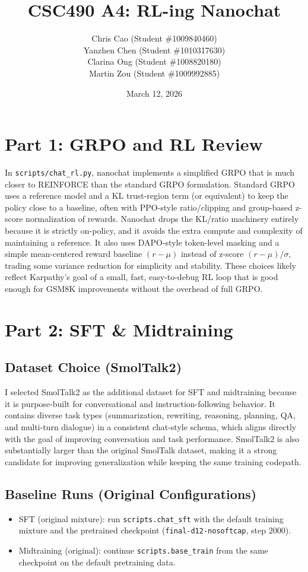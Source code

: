 \documentclass[11pt]{article}
\title{CSC490 A4: RL-ing Nanochat}
\author{
Chris Cao (Student \#1009840460)\\
Yanzhen Chen (Student \#1010317630)\\
Clarina Ong (Student \#1008820180)\\
Martin Zou (Student \#1009992885)
}
\date{March 12, 2026}
\begin{document}
\maketitle

\section*{Part 1: GRPO and RL Review}
In \texttt{scripts/chat\_rl.py}, nanochat implements a simplified GRPO that is much closer to REINFORCE than the standard GRPO formulation. Standard GRPO uses a reference model and a KL trust-region term (or equivalent) to keep the policy close to a baseline, often with PPO-style ratio/clipping and group-based z-score normalization of rewards. Nanochat drops the KL/ratio machinery entirely because it is strictly on-policy, and it avoids the extra compute and complexity of maintaining a reference. It also uses DAPO-style token-level masking and a simple mean-centered reward baseline $(r - \mu)$ instead of z-score $(r - \mu)/\sigma$, trading some variance reduction for simplicity and stability. These choices likely reflect Karpathy's goal of a small, fast, easy-to-debug RL loop that is good enough for GSM8K improvements without the overhead of full GRPO.

\section*{Part 2: SFT \& Midtraining}

\subsection*{Dataset Choice (SmolTalk2)}
I selected SmolTalk2 as the additional dataset for SFT and midtraining because it is purpose-built for conversational and instruction-following behavior. It contains diverse task types (summarization, rewriting, reasoning, planning, QA, and multi-turn dialogue) in a consistent chat-style schema, which aligns directly with the goal of improving conversation and task performance. SmolTalk2 is also substantially larger than the original SmolTalk dataset, making it a strong candidate for improving generalization while keeping the same training codepath.

\subsection*{Baseline Runs (Original Configurations)}
\begin{itemize}
\item SFT (original mixture): run \texttt{scripts.chat\_sft} with the default training mixture and the pretrained checkpoint (\texttt{final-d12-nosoftcap}, step 2000).
\item Midtraining (original): continue \texttt{scripts.base\_train} from the same checkpoint on the default pretraining data.
\end{itemize}
\end{document}
